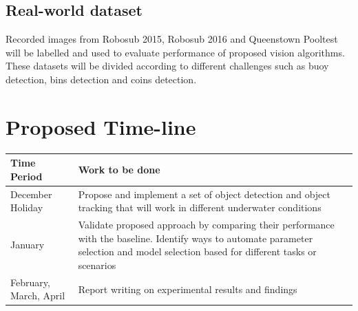 \documentclass[fypca]{socreport}
\begin{document}
\subsection{Real-world dataset}
Recorded images from Robosub 2015, Robosub 2016 and Queenstown Pooltest will be labelled and used to evaluate performance of proposed vision algorithms. These datasets will be divided according to different challenges such as buoy detection, bins detection and coins detection.

\section{Proposed Time-line}
\begin{center}
    \begin{tabular}{ | l | p{10cm} |}
    \hline
    Time Period & Work to be done \\ \hline
    December Holiday & Propose and implement a set of object detection and object tracking that will work in different underwater conditions
    \\ \hline
    January & Validate proposed approach by comparing their performance with the baseline.
    Identify ways to automate parameter selection and model selection based for different tasks or scenarios
     \\ \hline
    February, March, April & Report writing on experimental results and findings
    \\
    \hline
    \end{tabular}
\end{center}


{}

\end{document}

